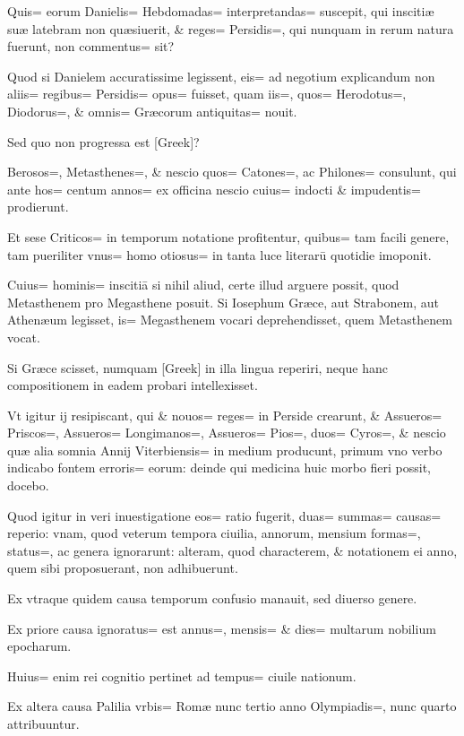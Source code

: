 \begin{parnumbers}

Quis= eorum Danielis=  Hebdomadas= interpretandas= suscepit, qui inscitiæ suæ latebram non quæsiuerit, \& reges= Persidis=, qui nunquam in rerum natura fuerunt, non commentus= sit?

Quod si Danielem accuratissime legissent, eis= ad negotium explicandum non aliis= regibus= Persidis= opus= fuisset, quam iis=, quos= Herodotus=, Diodorus=, \& omnis= Græcorum antiquitas= nouit.

Sed quo non progressa est [Greek]?

Berosos=, Metasthenes=, \& nescio quos= Catones=, ac Philones= consulunt, qui ante hos= centum annos= ex officina nescio cuius= indocti \& impudentis= prodierunt.

Et sese Criticos= in temporum notatione profitentur, quibus= tam facili genere, tam pueriliter vnus= homo otiosus= in tanta luce literarū quotidie imoponit.

 Cuius= hominis= inscitiā si nihil aliud, certe illud arguere possit, quod Metasthenem pro Megasthene posuit. Si Iosephum Græce, aut Strabonem, aut Athenæum legisset, is= Megasthenem vocari deprehendisset, quem Metasthenem vocat.

Si Græce scisset, numquam [Greek] in illa lingua reperiri, neque hanc compositionem in eadem probari intellexisset.

Vt igitur ij resipiscant, qui \& nouos= reges= in Perside crearunt, \& Assueros= Priscos=, Assueros= Longimanos=, Assueros= Pios=, duos= Cyros=, \& nescio quæ alia somnia Annij Viterbiensis= in medium producunt, primum vno verbo indicabo fontem erroris= eorum: deinde qui medicina huic morbo fieri possit, docebo.

Quod igitur in veri inuestigatione  eos= ratio fugerit, duas= summas= causas= reperio: vnam, quod veterum tempora ciuilia, annorum, mensium formas=, status=, ac genera ignorarunt: alteram, quod characterem, \& notationem ei anno, quem sibi proposuerant, non adhibuerunt.

Ex vtraque quidem causa temporum confusio manauit, sed diuerso genere.

Ex priore causa ignoratus= est annus=, mensis= \& dies= multarum nobilium epocharum.

Huius= enim rei cognitio pertinet ad tempus= ciuile nationum.

Ex altera causa Palilia vrbis= Romæ nunc tertio anno Olympiadis=, nunc quarto attribuuntur.


\end{parnumbers}
